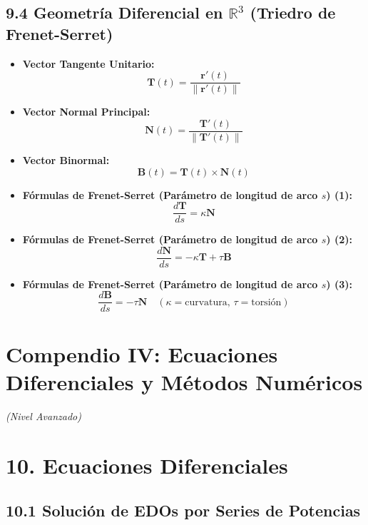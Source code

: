 \documentclass[11pt,a4paper]{article}
\begin{document}
\subsection*{9.4 Geometría Diferencial en $\mathbb{R}^3$ (Triedro de Frenet-Serret)}

\begin{itemize}
  \item \textbf{Vector Tangente Unitario:}
  \[
    \mathbf{T}(t) = \frac{\mathbf{r}'(t)}{\|\mathbf{r}'(t)\|}
  \]
  \item \textbf{Vector Normal Principal:}
  \[
    \mathbf{N}(t) = \frac{\mathbf{T}'(t)}{\|\mathbf{T}'(t)\|}
  \]
  \item \textbf{Vector Binormal:}
  \[
    \mathbf{B}(t) = \mathbf{T}(t) \times \mathbf{N}(t)
  \]
  \item \textbf{Fórmulas de Frenet-Serret (Parámetro de longitud de arco $s$) (1):}
  \[
    \frac{d\mathbf{T}}{ds} = \kappa \mathbf{N}
  \]
  \item \textbf{Fórmulas de Frenet-Serret (Parámetro de longitud de arco $s$) (2):}
  \[
    \frac{d\mathbf{N}}{ds} = -\kappa \mathbf{T} + \tau \mathbf{B}
  \]
  \item \textbf{Fórmulas de Frenet-Serret (Parámetro de longitud de arco $s$) (3):}
  \[
    \frac{d\mathbf{B}}{ds} = -\tau \mathbf{N} \quad (\kappa = \text{curvatura}, \, \tau = \text{torsión})
  \]
\end{itemize}

\section*{Compendio IV: Ecuaciones Diferenciales y Métodos Numéricos}

\textit{(Nivel Avanzado)}

\section*{10. Ecuaciones Diferenciales}

\subsection*{10.1 Solución de EDOs por Series de Potencias}
\end{document}
